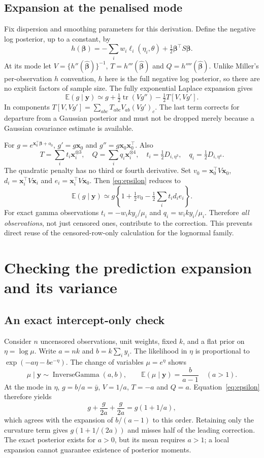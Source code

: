 \documentclass[11pt,a4paper]{article}
\newcommand{\E}{\mathbb{E}}
\newcommand{\tr}{\operatorname{tr}}
\begin{document}
\subsection{Expansion at the penalised mode}
Fix dispersion and smoothing parameters for this derivation. Define the
negative log posterior, up to a constant, by
\[
 h(\bm\beta)=-\sum_iw_i\ell_i(\eta_i,\theta)
            +\tfrac12\bm\beta^\top S\bm\beta.
\]
At its mode let $V=\{h''(\widehat{\bm\beta})\}^{-1}$,
$T=h'''(\widehat{\bm\beta})$ and $Q=h''''(\widehat{\bm\beta})$.
Unlike Miller's per-observation $h$ convention, $h$ here is the full
negative log posterior, so there are no explicit factors of sample size.
The fully exponential Laplace expansion gives
\begin{equation}
 \E(g\mid\bm y)\simeq
 g+\tfrac12\tr(Vg'')-\tfrac12 T[V,Vg'].
 \label{eq:epsilon}
\end{equation}
In components $T[V,Vg']=\sum_{abc}T_{abc}V_{ab}(Vg')_c$.
The last term corrects for departure from a Gaussian posterior and must not
be dropped merely because a Gaussian covariance estimate is available.

For $g=e^{\bm x_0^\top\bm\beta+o_0}$,
$g'=g\bm x_0$ and $g''=g\bm x_0\bm x_0^\top$. Also
\[
 T=\sum_it_i\bm x_i^{\otimes3},\quad
 Q=\sum_iq_i\bm x_i^{\otimes4},\quad
 t_i=\tfrac12D_{i,\eta^3},\quad q_i=\tfrac12D_{i,\eta^4}.
\]
The quadratic penalty has no third or fourth derivative. Set
$v_0=\bm x_0^\top V\bm x_0$,
$d_i=\bm x_i^\top V\bm x_i$ and $e_i=\bm x_i^\top V\bm x_0$.
Then \eqref{eq:epsilon} reduces to
\begin{equation}
 \boxed{\E(g\mid\bm y)\simeq
 g\left\{1+\tfrac12v_0-\tfrac12\sum_it_id_ie_i\right\}.}
 \label{eq:epsiloncontract}
\end{equation}
For exact gamma observations $t_i=-w_i k y_i/\mu_i$ and
$q_i=w_i k y_i/\mu_i$. Therefore \emph{all observations}, not just censored
ones, contribute to the correction. This prevents direct reuse of the
censored-row-only calculation for the lognormal family.

\newpage
\section{Checking the prediction expansion and its variance}
\subsection{An exact intercept-only check}
Consider $n$ uncensored observations, unit weights, fixed $k$, and a flat
prior on $\eta=\log\mu$. Write $a=nk$ and $b=k\sum_i y_i$.
The likelihood in $\eta$ is proportional to $\exp(-a\eta-be^{-\eta})$.
The change of variables $\mu=e^\eta$ shows
\[
 \mu\mid\bm y\sim\operatorname{InverseGamma}(a,b),\qquad
 \E(\mu\mid\bm y)=\frac{b}{a-1}\quad(a>1).
\]
At the mode in $\eta$, $g=b/a=\bar y$, $V=1/a$, $T=-a$ and $Q=a$.
Equation~\eqref{eq:epsilon} therefore yields
\[
 g+\frac{g}{2a}+\frac{g}{2a}=g(1+1/a),
\]
which agrees with the expansion of $b/(a-1)$ to this order. Retaining only
the curvature term gives $g(1+1/(2a))$ and misses half of the leading
correction. The exact posterior exists for $a>0$, but its mean requires
$a>1$; a local expansion cannot guarantee existence of posterior moments.
\end{document}
